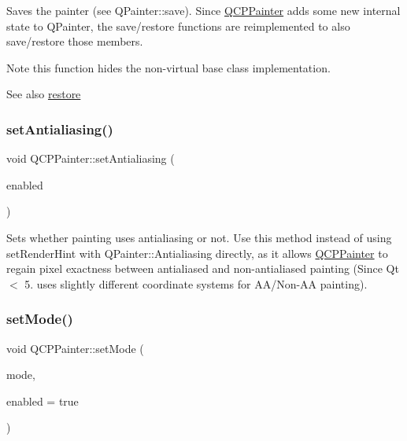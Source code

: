 Saves the painter (see Q\+Painter\+::save). Since \mbox{\hyperlink{class_q_c_p_painter}{Q\+C\+P\+Painter}} adds some new internal state to Q\+Painter, the save/restore functions are reimplemented to also save/restore those members.

\begin{DoxyNote}{Note}
this function hides the non-\/virtual base class implementation.
\end{DoxyNote}
\begin{DoxySeeAlso}{See also}
\mbox{\hyperlink{class_q_c_p_painter_a64908e6298d5bbd83457dc987cc3a022}{restore}} 
\end{DoxySeeAlso}
\mbox{\label{class_q_c_p_painter_aaba1deb9188244d9ea65b035112b4d05}} 
\subsubsection{\texorpdfstring{set\+Antialiasing()}{setAntialiasing()}}
{\footnotesize\ttfamily void Q\+C\+P\+Painter\+::set\+Antialiasing (\begin{DoxyParamCaption}\item[{bool}]{enabled }\end{DoxyParamCaption})}

Sets whether painting uses antialiasing or not. Use this method instead of using set\+Render\+Hint with Q\+Painter\+::\+Antialiasing directly, as it allows \mbox{\hyperlink{class_q_c_p_painter}{Q\+C\+P\+Painter}} to regain pixel exactness between antialiased and non-\/antialiased painting (Since Qt $<$ 5. uses slightly different coordinate systems for A\+A/\+Non-\/\+AA painting). \mbox{\label{class_q_c_p_painter_af6b1f7d2bbc548b10aa55d8b6ad49577}} 
\subsubsection{\texorpdfstring{set\+Mode()}{setMode()}}
{\footnotesize\ttfamily void Q\+C\+P\+Painter\+::set\+Mode (\begin{DoxyParamCaption}\item[{\mbox{\hyperlink{class_q_c_p_painter_a156cf16444ff5e0d81a73c615fdb156d}{Q\+C\+P\+Painter\+::\+Painter\+Mode}}}]{mode,  }\item[{bool}]{enabled = {\ttfamily true} }\end{DoxyParamCaption})}

